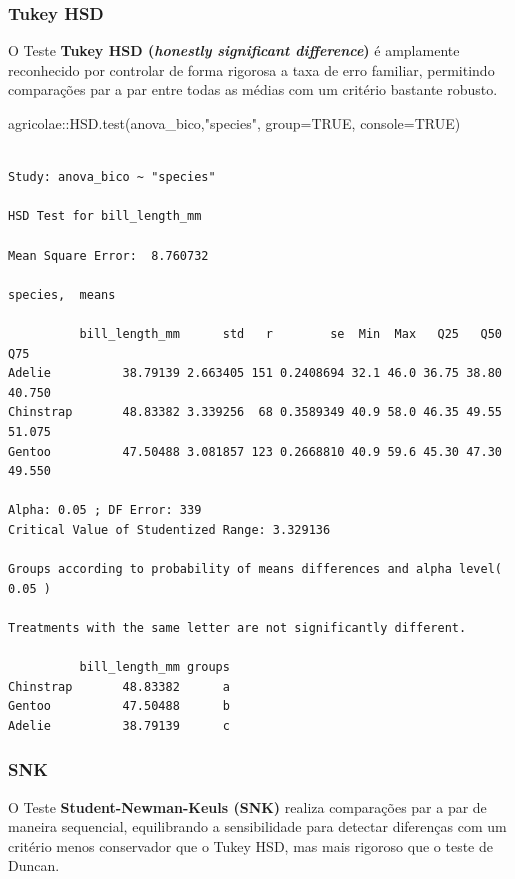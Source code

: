 \documentclass[
  letterpaper,
  DIV=11,
  numbers=noendperiod,
  oneside]{scrartcl}
\newenvironment{Shaded}{\begin{snugshade}}{\end{snugshade}}
\newcommand{\AttributeTok}[1]{\textcolor[rgb]{0.40,0.45,0.13}{#1}}
\newcommand{\ConstantTok}[1]{\textcolor[rgb]{0.56,0.35,0.01}{#1}}
\newcommand{\FunctionTok}[1]{\textcolor[rgb]{0.28,0.35,0.67}{#1}}
\newcommand{\NormalTok}[1]{\textcolor[rgb]{0.00,0.23,0.31}{#1}}
\newcommand{\SpecialCharTok}[1]{\textcolor[rgb]{0.37,0.37,0.37}{#1}}
\newcommand{\StringTok}[1]{\textcolor[rgb]{0.13,0.47,0.30}{#1}}
\begin{document}
\subsubsection{Tukey HSD}\label{tukey-hsd}

O Teste \textbf{Tukey HSD (\emph{honestly significant difference})} é
amplamente reconhecido por controlar de forma rigorosa a taxa de erro
familiar, permitindo comparações par a par entre todas as médias com um
critério bastante robusto.

\begin{Shaded}
\begin{Highlighting}[]
\NormalTok{agricolae}\SpecialCharTok{::}\FunctionTok{HSD.test}\NormalTok{(anova\_bico,}\StringTok{"species"}\NormalTok{, }\AttributeTok{group=}\ConstantTok{TRUE}\NormalTok{, }\AttributeTok{console=}\ConstantTok{TRUE}\NormalTok{)}
\end{Highlighting}
\end{Shaded}

\begin{verbatim}

Study: anova_bico ~ "species"

HSD Test for bill_length_mm 

Mean Square Error:  8.760732 

species,  means

          bill_length_mm      std   r        se  Min  Max   Q25   Q50    Q75
Adelie          38.79139 2.663405 151 0.2408694 32.1 46.0 36.75 38.80 40.750
Chinstrap       48.83382 3.339256  68 0.3589349 40.9 58.0 46.35 49.55 51.075
Gentoo          47.50488 3.081857 123 0.2668810 40.9 59.6 45.30 47.30 49.550

Alpha: 0.05 ; DF Error: 339 
Critical Value of Studentized Range: 3.329136 

Groups according to probability of means differences and alpha level( 0.05 )

Treatments with the same letter are not significantly different.

          bill_length_mm groups
Chinstrap       48.83382      a
Gentoo          47.50488      b
Adelie          38.79139      c
\end{verbatim}

\subsubsection{SNK}\label{snk}

O Teste \textbf{Student-Newman-Keuls (SNK)} realiza comparações par a
par de maneira sequencial, equilibrando a sensibilidade para detectar
diferenças com um critério menos conservador que o Tukey HSD, mas mais
rigoroso que o teste de Duncan.
\end{document}
